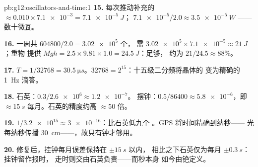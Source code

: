 \begin{solution}{pb:g12:oscillators-and-time:1}
\textbf{15.} 每次推动补充的 $\approx 0.010 \times \num{7.1e-3} =
\qty{7.1e-5}{J}$； $\num{7.1e-5}/2.0 \approx \qty{3.5e-5}{W}$
——数十微瓦。

\textbf{16.} 一周共 $604800/2.0 = \num{3.02e5}$ 个，
需 $\num{3.02e5} \times \num{7.1e-5} \approx \qty{21}{J}$；重物
提供 $Mgh = 2.5 \times 9.81 \times 1.0 = \qty{24.5}{J}$：足够，
约为 $21/24.5 \approx 88\%$。

\textbf{17.} $T = 1/\num{32768} = \qty{30.5}{\micro s}$。$\num{32768}
= 2^{15}$：十五级二分频将晶体的
变为精确的 \qty{1}{Hz} 滴答。

\textbf{18.} 石英：$0.3/\num{2.6e6} \approx \num{1.2e-7}$。
摆钟：$0.5/86400 \approx \num{5.8e-6}$，即 $\approx
\qty{15}{s}$ 每月。石英的精度约高 $\approx 50$ 倍。

\textbf{19.} $1/\num{3.2e15} \approx \num{3e-16}$：比石英低九个
。GPS 将时间精确到纳秒——
光每纳秒传播 \qty{30}{cm}——，故只有钟才够用。

\textbf{20.} 修复后，挂钟每月误差保持在 $\pm\qty{15}{s}$ 以内，
相比之下石英仅为每月 $\pm\qty{0.3}{s}$：挂钟留作报时，
走时则交由石英负责——而秒本身
如今由铯定义。
\end{solution}
